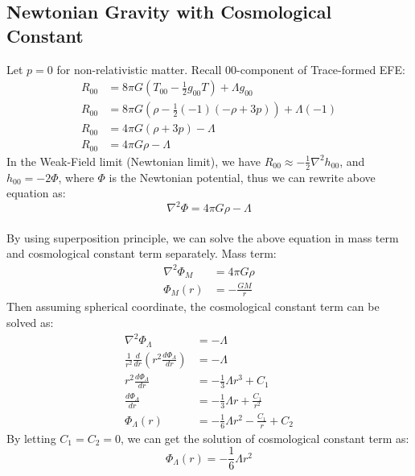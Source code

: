 \clearpage
\subsection{Newtonian Gravity with Cosmological Constant}
\begin{foundation}
    Let $p = 0$ for non-relativistic matter. Recall 00-component of Trace-formed EFE:
    \begin{align*}
        R_{00} &= 8\pi G (T_{00} - \frac{1}{2}g_{00}T) + \Lambda g_{00} \\
        R_{00} &= 8\pi G (\rho - \frac{1}{2}(-1)(-\rho + 3p)) + \Lambda (-1) \\
        R_{00} &= 4\pi G (\rho + 3p) - \Lambda \\
        R_{00} &= 4\pi G \rho - \Lambda
    \end{align*}
    In the Weak-Field limit (Newtonian limit), we have $R_{00} \approx - \frac{1}{2}\nabla^2 h_{00}$, and $h_{00} = -2\Phi$, where $\Phi$ is the Newtonian potential, thus we can rewrite above equation as:
    \[
        \nabla^2 \Phi = 4\pi G \rho - \Lambda
    \] \\

    By using superposition principle, we can solve the above equation in mass term and cosmological constant term separately. Mass term:
    \begin{align*}
        \nabla^2 \Phi_M &= 4\pi G \rho \\
        \Phi_M(r) &= -\frac{GM}{r}
    \end{align*}
    Then assuming spherical coordinate, the cosmological constant term can be solved as:
    \begin{align*}
        \nabla^2 \Phi_\Lambda &= -\Lambda \\
        \frac{1}{r^2} \frac{d}{dr} \left( r^2 \frac{d\Phi_\Lambda}{dr} \right) &= -\Lambda \\
        r^2 \frac{d\Phi_\Lambda}{dr} &= -\frac{1}{3}\Lambda r^3 + C_1 \\
        \frac{d\Phi_\Lambda}{dr} &= -\frac{1}{3}\Lambda r + \frac{C_1}{r^2} \\
        \Phi_\Lambda(r) &= -\frac{1}{6}\Lambda r^2 - \frac{C_1}{r} + C_2
    \end{align*}
    By letting $C_1 = C_2 = 0$, we can get the solution of cosmological constant term as:
    \[
        \Phi_\Lambda(r) = -\frac{1}{6}\Lambda r^2
    \]
\end{foundation}

